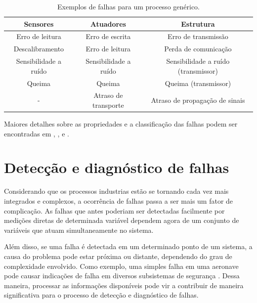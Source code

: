 \begin{table}[htb]
\small
\centering
\caption{Exemplos de falhas para um processo genérico.}
\label{tab:falhas}
\vspace{0.25cm}
\begin{tabular}{|c|c|c|}
\hline
{\bf Sensores} & {\bf Atuadores} & {\bf Estrutura}\\
\hline
\hline
Erro de leitura & Erro de escrita & Erro de transmissão\\
\hline
Descalibramento & Erro de leitura & Perda de comunicação\\
\hline
Sensibilidade a ruído & Sensibilidade a ruído & Sensibilidade a ruído
(transmissor)\\
\hline
Queima & Queima & Queima (transmissor)\\
\hline
- & Atraso de transporte & Atraso de propagação de sinais\\
\hline
\end{tabular}
\end{table}

Maiores detalhes sobre as propriedades e a classificação das falhas podem ser
encontradas em , ,
 e .


\section{Detecção e diagnóstico de falhas}
Considerando que os processos industrias estão se tornando cada vez mais integrados e
complexos, a ocorrência de falhas passa a ser mais um fator de complicação. As
falhas que antes poderiam ser detectadas facilmente por medições diretas de
determinada variável dependem agora de um conjunto de variáveis que atuam
simultaneamente no sistema. 

Além disso, se uma falha é detectada em um determinado ponto de um sistema, a
causa do problema pode estar próxima ou distante, dependendo do grau de
complexidade envolvido. Como exemplo, uma simples falha em uma aeronave pode
causar indicações de falha em diversos subsistemas de segurança
\cite{vach:2006}. Dessa maneira, processar as informações disponíveis pode vir a
contribuir de maneira significativa para o processo de detecção e diagnóstico de
falhas.

